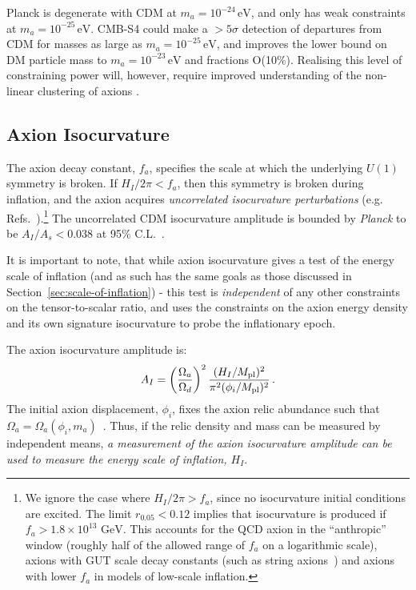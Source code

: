 Planck is degenerate with CDM at $m_a=10^{-24}\,\mathrm{eV}$, and only has weak constraints at $m_a=10^{-25}\,\mathrm{eV}$. CMB-S4 could make a $>5\sigma$ detection of departures from CDM for masses as large as $m_a=10^{-25}\,\mathrm{eV}$, and improves the lower bound on DM particle mass to $m_a=10^{-23}\,\mathrm{eV}$ and fractions O(10\%). Realising this level of constraining power will, however, require improved understanding of the non-linear clustering of axions \cite{Marsh:2016vgj}.

\subsection{Axion Isocurvature \label{axion_iso}}
The axion decay constant, $f_a$, specifies the scale at which the underlying $U(1)$ symmetry is broken. If $H_I/2\pi<f_a$, then this symmetry is broken during inflation, and the axion acquires \emph{uncorrelated isocurvature perturbations} (e.g. Refs.~\cite{Axenides:1983hj,Fox:2004kb,Hertzberg:2008wr}).\footnote{We ignore the case where $H_I/2\pi>f_a$, since no isocurvature initial conditions are excited. The limit $r_{0.05}<0.12$ implies that isocurvature is produced if $f_a>1.8\times 10^{13}\text{ GeV}$. This accounts for the QCD axion in the ``anthropic'' window (roughly half of the allowed range of $f_a$ on a logarithmic scale), axions with GUT scale decay constants (such as string axions~\cite{Svrcek:2006yi,Arvanitaki:2009fg}) and axions with lower $f_a$ in models of low-scale inflation.} The uncorrelated CDM isocurvature amplitude is bounded by \emph{Planck} to be $A_I/A_s<0.038$ at 95\% C.L.~\cite{Ade:2015lrj}. 

It is important to note, that while axion isocurvature gives a test of the energy scale of inflation (and as such has the same goals as those discussed in Section~\ref{sec:scale-of-inflation}) - this test is \textit{independent} of any other constraints on the tensor-to-scalar ratio, and uses the constraints on the axion energy density and its own signature isocurvature to probe the inflationary epoch.

The axion isocurvature amplitude is:
\begin{equation}
A_I = \left(\frac{\Omega_a}{\Omega_d}\right)^2\frac{(H_I/M_{\rm pl})^2}{\pi^2(\phi_i/M_{\rm pl})^2} \, .
\label{eqn:iso_amplitude}
\end{equation}
The initial axion displacement, $\phi_i$, fixes the axion relic abundance such that $\Omega_a=\Omega_a (\phi_i,m_a)$~\cite{Preskill:1982cy,Abbott:1982af,Dine:1982ah,Turner:1983he,Steinhardt:1983ia,Marsh:2010wq}. Thus, if the relic density and mass can be measured by independent means, \emph{a measurement of the axion isocurvature amplitude can be used to measure the energy scale of inflation, $H_I$}.

